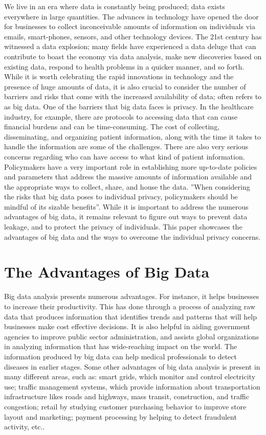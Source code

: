 \documentclass[sigconf]{acmart}
\begin{document}
We live in an era where data is constantly being produced; data exists everywhere in large quantities. The advances in technology have opened the door for businesses to collect inconceivable amounts of information on individuals via emails, smart-phones, sensors, and other technology devices. The 21st century has witnessed a data explosion; many fields have experienced a data deluge that can contribute to boast the economy via data analysis, make new discoveries based on existing data, respond to health problems in a quicker manner, and so forth. While it is worth celebrating the rapid innovations in technology and the presence of huge amounts of data, it is also crucial to consider the number of barriers and risks that come with the increased availability of data; often refers to as big data. 
One of the barriers that big data faces is privacy. In the healthcare industry, for example, there are protocols to accessing data that can cause financial burdens and can be time-consuming.  The cost of collecting, disseminating, and organizing patient information, along with the time it takes to handle the information are some of the challenges. There are also very serious concerns regarding who can have access to what kind of patient information. Policymakers have a very important role in establishing more up-to-date policies and parameters that address the massive amounts of information available and the appropriate ways to collect, share, and house the data. ''When considering the risks that big data poses to individual privacy, policymakers should be mindful of its sizable benefits''\cite{tene2012big}. While it is important to address the numerous advantages of big data, it remains relevant to figure out ways to prevent data leakage, and to protect the privacy of individuals. This paper showcases the advantages of big data and the ways to overcome the individual privacy concerns. 

\section{The Advantages of Big Data}

Big data analysis presents numerous advantages. For instance, it helps businesses to increase their productivity. This has done through a process of analyzing raw data that produces information that identifies trends and patterns that will help businesses make cost effective decisions. It is also helpful in aiding government agencies to improve public sector administration, and assists global organizations in analyzing information that has wide-reaching impact on the world. The information produced by big data can help medical professionals to detect diseases in earlier stages. Some other advantages of big data analysis is present in many different areas, such as:  smart grids, which monitor and control electricity use; traffic management systems, which provide information about transportation infrastructure likes roads and highways, mass transit, construction, and traffic congestion; retail by studying customer purchasing behavior to improve store layout and marketing; payment processing by helping to detect fraudulent activity, etc.\cite{tene2012big}.
\end{document}
